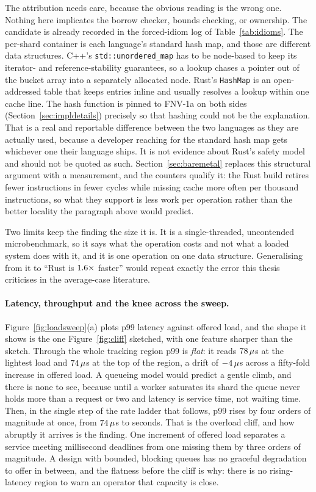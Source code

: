 \documentclass[english,oneside,a4paper,censored,csm,software-track-2020]{HYthesisML}
\begin{document}
The attribution needs care, because the obvious reading is the wrong one. Nothing here
implicates the borrow checker, bounds checking, or ownership. The candidate is
already recorded in the forced-idiom log of Table~\ref{tab:idioms}. The per-shard container is
each language's standard hash map, and those are different data structures. C++'s
\texttt{std::unordered\_map} has to be node-based to keep its iterator- and reference-stability
guarantees, so a lookup chases a pointer out of the bucket array into a separately allocated
node. Rust's \texttt{HashMap} is an open-addressed table that keeps entries inline and
usually resolves a lookup within one cache line. The hash function is pinned to FNV-1a on both
sides (Section~\ref{sec:impldetails}) precisely so that hashing could not be the explanation.
That is a real and reportable difference between the two
languages as they are actually used, because a developer reaching for the standard hash map gets
whichever one their language ships. It is not evidence about Rust's safety model and should
not be quoted as such. Section~\ref{sec:baremetal} replaces this structural argument with a
measurement, and the counters qualify it: the Rust build retires fewer instructions in fewer
cycles while missing cache more often per thousand instructions, so what they support is less
work per operation rather than the better locality the paragraph above would predict.

Two limits keep the finding the size it is. It is a single-threaded, uncontended
microbenchmark, so it says what the operation costs and not what a loaded system does with it, and
it is one operation on one data structure. Generalising from it to ``Rust is
$1.6\times$ faster'' would repeat exactly the error this thesis criticises in the
average-case literature.

\paragraph{Latency, throughput and the knee across the sweep.}
Figure~\ref{fig:loadsweep}(a) plots p99 latency against offered load, and the shape it shows is
the one Figure~\ref{fig:cliff} sketched, with one feature sharper than the sketch. Through the whole
tracking region p99 is \emph{flat}: it reads $78\,\mu$s at the lightest load and
$74\,\mu$s at the top of the region, a drift of
$-4\,\mu$s across a fifty-fold increase in offered load. A queueing model would
predict a gentle climb, and there is none to see, because until a worker saturates its shard the
queue never holds more than a request or two and latency is service time, not waiting time.
Then, in the single step of the rate ladder that follows, p99 rises by four orders of magnitude at
once, from $74\,\mu$s to seconds. That is the overload cliff, and how abruptly it
arrives is the finding. One increment of offered load separates a service meeting millisecond
deadlines from one missing them by three orders of magnitude. A design with bounded, blocking queues
has no graceful degradation to offer in between, and the flatness before the cliff is why: there is
no rising-latency region to warn an operator that capacity is close.
\end{document}
